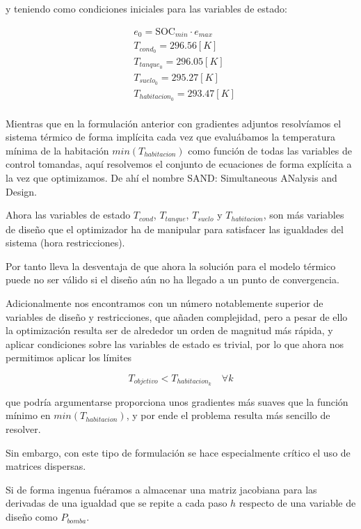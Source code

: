 y teniendo como condiciones iniciales para las variables de estado:

\begin{align}
	 & e_0 = \text{SOC}_{min} \cdot e_{max} \\
	 & T_{cond_0} = 296.56 [K]              \\
	 & T_{tanque_0} = 296.05[K]             \\
	 & T_{suelo_0} = 295.27[K]              \\
	 & T_{habitacion_0} = 293.47[K]         \\
\end{align}


Mientras que en la formulación anterior con gradientes adjuntos resolvíamos el
sistema térmico de forma implícita cada vez que evaluábamos la temperatura
mínima de la habitación $min(T_{habitacion})$ como función de todas las
variables de control tomandas, aquí resolvemos el conjunto de ecuaciones de
forma explícita a la vez que optimizamos. De ahí el nombre SAND: Simultaneous
ANalysis and Design.

Ahora las variables de estado $T_{cond}$, $T_{tanque}$, $T_{suelo}$ y
$T_{habitacion}$, son más variables de diseño que el optimizador ha de
manipular para satisfacer las igualdades del sistema (hora restricciones).

Por tanto lleva la desventaja de que ahora la solución para el modelo térmico
puede no ser válido si el diseño aún no ha llegado a un punto de convergencia.

Adicionalmente nos encontramos con un número notablemente superior de variables
de diseño y restricciones, que añaden complejidad, pero a pesar de ello la
optimización resulta ser de alrededor un orden de magnitud más rápida, y
aplicar condiciones sobre las variables de estado es trivial, por lo que ahora
nos permitimos aplicar los límites

\begin{equation*}
	T_{objetivo} < T_{habitacion_k} \quad \forall k
\end{equation*}

que podría argumentarse proporciona unos gradientes más suaves que la función
mínimo en $min(T_{habitacion})$, y por ende el problema resulta más sencillo de
resolver.

Sin embargo, con este tipo de formulación se hace especialmente crítico el uso
de matrices dispersas.

Si de forma ingenua fuéramos a almacenar una
matriz jacobiana para las derivadas de una igualdad que se repite a cada paso
$h$ respecto de una variable de diseño como $P_{bomba}$.

